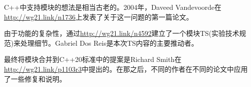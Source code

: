 C++中支持模块的想法是相当古老的。2004年，Daveed Vandevoorde在\url{http://wg21.link/n1736}上发表了关于这一问题的第一篇论文。

由于功能的复杂性，通过\url{http://wg21.link/n4592}建立了一个模块TS(实验技术规范)来处理细节。Gabriel Dos Reis是本次TS内容的主要推动者。

最终将模块合并到C++20标准中的提案是Richard Smith在\url{http://wg21.link/p1103r3}中提出的。在那之后，不同的作者在不同的论文中应用了一些修复和说明。